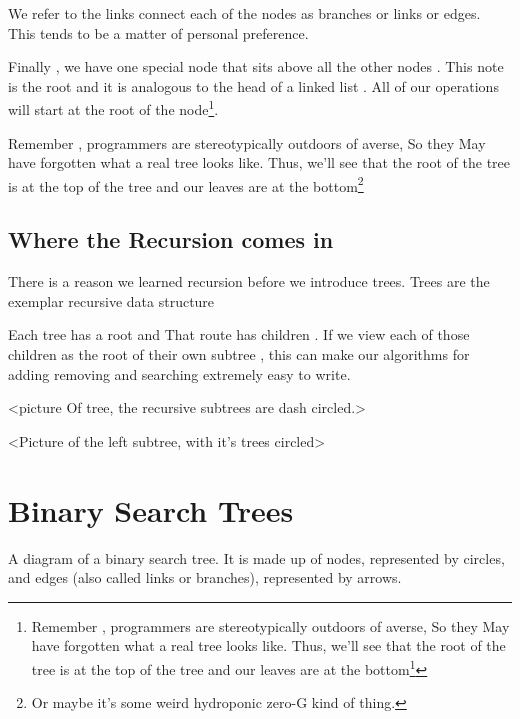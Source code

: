We refer to the links connect each of the nodes as branches or links or edges.  This tends to be a matter of personal preference.



Finally , we have one special node that sits above all the other nodes . This note is the root and it is analogous to the head of a linked list . All of our operations will start at the root of the node\footnote{Remember , programmers are stereotypically outdoors of averse, So they May have forgotten what a real tree looks like.  Thus, we'll see that the root of the tree is at the top of the tree and our leaves are at the bottom\footnote{Or maybe it's some weird hydroponic zero-G kind of thing.}}.


Remember , programmers are stereotypically outdoors of averse, So they May have forgotten what a real tree looks like.  Thus, we'll see that the root of the tree is at the top of the tree and our leaves are at the bottom\footnote{Or maybe it's some weird hydroponic zero-G kind of thing.}


\subsection{Where the  Recursion comes in}
There is a reason we learned recursion before we introduce trees. Trees are the exemplar recursive data structure

Each tree has a root and That route has children .  If we view each of those children as the root of their own subtree , this can make our algorithms for adding removing and searching extremely easy to write.

<picture Of tree, the recursive subtrees are dash circled.>

<Picture of the left subtree, with it's trees circled>




















\section{Binary Search Trees}

A diagram of a binary search tree.  It is made up of nodes, represented by circles, and edges (also called links or branches), represented by arrows.  


